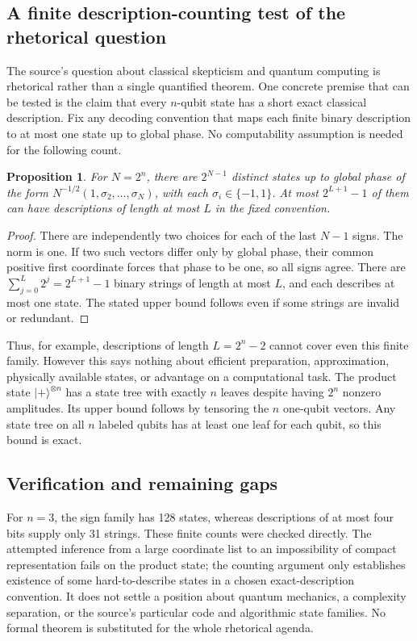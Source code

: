 \documentclass[11pt]{article}
\newtheorem{proposition}{Proposition}
\begin{document}
\subsection{A finite description-counting test of the rhetorical question}
The source's question about classical skepticism and quantum computing is rhetorical rather than a single quantified theorem. One concrete premise that can be tested is the claim that every $n$-qubit state has a short exact classical description. Fix any decoding convention that maps each finite binary description to at most one state up to global phase. No computability assumption is needed for the following count.
\begin{proposition}
For $N=2^n$, there are $2^{N-1}$ distinct states up to global phase of the form $N^{-1/2}(1,\sigma_2,\ldots,\sigma_N)$, with each $\sigma_i\in\{-1,1\}$. At most $2^{L+1}-1$ of them can have descriptions of length at most $L$ in the fixed convention.
\end{proposition}
\begin{proof}
There are independently two choices for each of the last $N-1$ signs. The norm is one. If two such vectors differ only by global phase, their common positive first coordinate forces that phase to be one, so all signs agree. There are $\sum_{j=0}^L2^j=2^{L+1}-1$ binary strings of length at most $L$, and each describes at most one state. The stated upper bound follows even if some strings are invalid or redundant.
\end{proof}
Thus, for example, descriptions of length $L=2^n-2$ cannot cover even this finite family. However this says nothing about efficient preparation, approximation, physically available states, or advantage on a computational task. The product state $|+\rangle^{\otimes n}$ has a state tree with exactly $n$ leaves despite having $2^n$ nonzero amplitudes. Its upper bound follows by tensoring the $n$ one-qubit vectors. Any state tree on all $n$ labeled qubits has at least one leaf for each qubit, so this bound is exact.
\subsection{Verification and remaining gaps}
For $n=3$, the sign family has 128 states, whereas descriptions of at most four bits supply only 31 strings. These finite counts were checked directly. The attempted inference from a large coordinate list to an impossibility of compact representation fails on the product state; the counting argument only establishes existence of some hard-to-describe states in a chosen exact-description convention. It does not settle a position about quantum mechanics, a complexity separation, or the source's particular code and algorithmic state families. No formal theorem is substituted for the whole rhetorical agenda.
\end{document}
